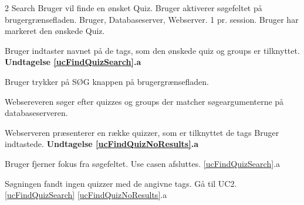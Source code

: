 \uchead
	{2}
	{Search}
	{Bruger vil finde en ønsket Quiz.}
	{Bruger aktiverer søgefeltet på brugergrænsefladen.}
	{Bruger, Databaseserver, Webserver.}
	{}
	{1 pr. session.}
	{Bruger har markeret den ønskede Quiz.}

\item \label{ucFindQuizSearch} Bruger indtaster navnet på de tags, som den ønskede quiz og groups er tilknyttet. 
\textbf{Undtagelse \ref{ucFindQuizSearch}.a}
\item Bruger trykker på SØG knappen på brugergrænsefladen.
\item Websereveren søger efter quizzes og groups der matcher søgeargumenterne på databaseserveren.

\item \label{ucFindQuizNoResults} Webserveren præsenterer en række quizzer, som er tilknyttet de tags Bruger indtastede.
\textbf{Undtagelse \ref{ucFindQuizNoResults}.a}


\ucdescriptionend

\ucextension
	{Bruger fjerner fokus fra søgefeltet.}
	{Use casen afsluttes.}
	{\ref{ucFindQuizSearch}.a}

\ucextension
	{Søgningen fandt ingen quizzer med de angivne tags.}
	{Gå til UC2.\ref{ucFindQuizSearch}}
	{\ref{ucFindQuizNoResults}.a}
				

